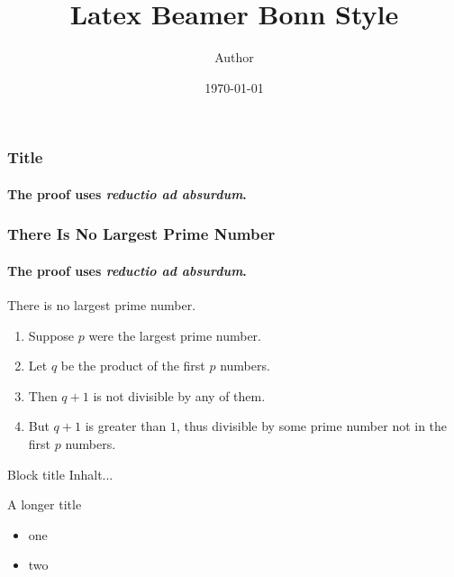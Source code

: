 \documentclass[aspectratio=1610]{beamer}
\title{Latex Beamer Bonn Style}
\date{\today}
\author{Author}
\begin{document}
	\begin{frame}[plain]
	\titlepage
\end{frame}

\begin{intro}
\frametitle{Title}
\framesubtitle{The proof uses \textit{reductio ad absurdum}.} 
\end{intro}

\begin{frame} 
\frametitle{There Is No Largest Prime Number} 
\framesubtitle{The proof uses \textit{reductio ad absurdum}.} 
\begin{theorem}
	There is no largest prime number. \end{theorem} 
\begin{enumerate} 
	\item<1-| alert@1> Suppose $p$ were the largest prime number. 
	\item<2-> Let $q$ be the product of the first $p$ numbers. 
	\item<3-> Then $q+1$ is not divisible by any of them. 
	\item<1-> But $q + 1$ is greater than $1$, thus divisible by some prime
	number not in the first $p$ numbers.
\end{enumerate}
\end{frame}

\begin{frame}
\begin{block}{Block title}
	Inhalt...
\end{block}
\end{frame}

\begin{frame}{A longer title}
\begin{itemize}
\item one
\item two
\end{itemize}
\end{frame}
\end{document}
